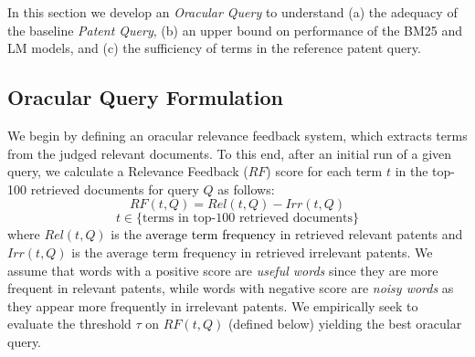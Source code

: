 %

In this section we develop an \emph{Oracular Query} to understand (a)
the adequacy of the baseline
\emph{Patent Query}, (b) an upper bound on performance of the
BM25 and LM models, and (c) the sufficiency of terms in the reference
patent query.

\subsection{Oracular Query Formulation}

We begin by defining an oracular relevance feedback system, which
extracts terms from the judged relevant documents. To this end, after an initial run of a given query, we
calculate a Relevance Feedback ($\mathit{RF}$) score for each term $t$ in the top-100
retrieved documents for query $Q$ as follows:
\begin{equation}
RF(t,Q)=Rel(t,Q)-Irr(t,Q) 
 \label{eq:score}
\end{equation}\vspace*{-5ex}
\begin{displaymath}t\in \lbrace \mbox{terms in top-100 retrieved documents}\rbrace\end{displaymath}
where $ \mathit{Rel(t,Q)} $ is the \textcolor{black}{average term frequency} in retrieved relevant patents and $ \mathit{Irr(t,Q)} $ is the average term frequency in retrieved irrelevant patents. We assume that words with a positive score are \emph{useful words} since they are more frequent in relevant patents, while words with negative score are \emph{noisy words} as they appear more frequently in irrelevant patents. We empirically seek to evaluate the threshold $\tau$ on $RF(t,Q)$ (defined below) yielding the best oracular query.

